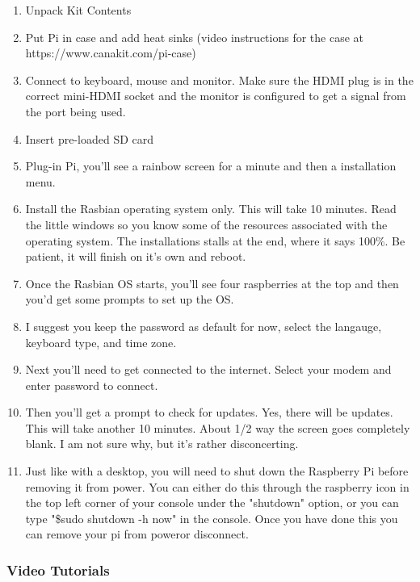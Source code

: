 \documentclass{article}\usepackage[]{graphicx}\usepackage[]{color}
\begin{document}
\begin{enumerate}

\item Unpack Kit Contents
\item Put Pi in case and add heat sinks (video instructions for the case at https://www.canakit.com/pi-case)
\item Connect to keyboard, mouse and monitor. Make sure the HDMI plug is in the correct mini-HDMI socket and the monitor is configured to get a signal from the port being used. 
\item Insert pre-loaded SD card
\item Plug-in Pi, you'll see a rainbow screen for a minute and then a installation menu. 
\item Install the Rasbian operating system only. This will take 10 minutes. Read the little windows so you know some of the resources associated with the operating system. The installations stalls at the end, where it says 100\%. Be patient, it will finish on it's own and reboot. 
\item Once the Rasbian OS starts, you'll see four raspberries at the top and then you'd get some prompts to set up the OS. 
\item I suggest you keep the password as default for now, select the langauge, keyboard type, and time zone. 
\item Next you'll need to get connected to the internet. Select your modem and enter password to connect.
\item Then you'll get a prompt to check for updates. Yes, there will be updates. This will take another 10 minutes. About 1/2 way the screen goes completely blank. I am not sure why, but it's rather disconcerting. \item Just like with a desktop, you will need to shut down the Raspberry Pi before removing it from power.  You can either do this through the raspberry icon in the top left corner of your console under the "shutdown" option, or you can type "\$sudo shutdown -h now" in the console.  Once you have done this you can remove your pi from poweror disconnect.

\end{enumerate}

\subsubsection{Video Tutorials}

\end{document}
